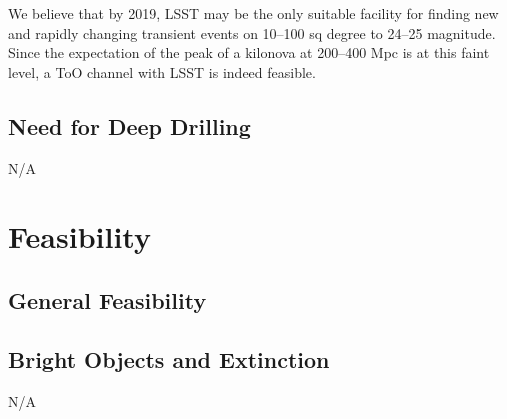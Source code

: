\documentclass [11pt]{article}
\begin{document}
We believe that by 2019, LSST may be the only suitable facility for finding new and rapidly changing transient events on 10--100 sq degree to 24--25 magnitude. Since the expectation of the peak of a kilonova at 200--400 Mpc is at this faint level, a ToO channel with LSST is indeed feasible.

\subsection{Need for Deep Drilling}


N/A

\section{Feasibility}


\subsection{General Feasibility}

%


\subsection{Bright Objects and Extinction}
 
%
%

N/A
\end{document}
